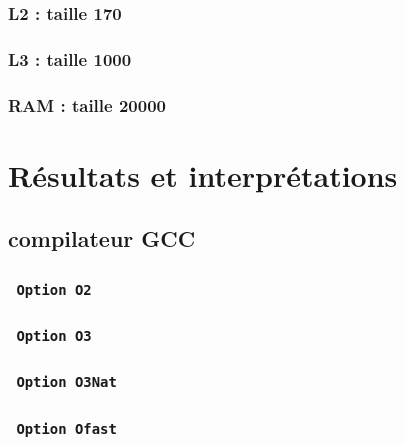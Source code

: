 \documentclass{report}
\begin{document}
    \subsubsection{L2 : taille 170}
    \subsubsection{L3 : taille 1000}
    \subsubsection{RAM : taille 20000}
\section{Résultats et interprétations}
    \subsection{compilateur GCC}
      \subsubsection{ \texttt{ Option O2 } }
      \subsubsection{ \texttt{ Option O3 }  }
      \subsubsection{ \texttt{ Option O3Nat} }
      \subsubsection{ \texttt{ Option Ofast } }
\end{document}
